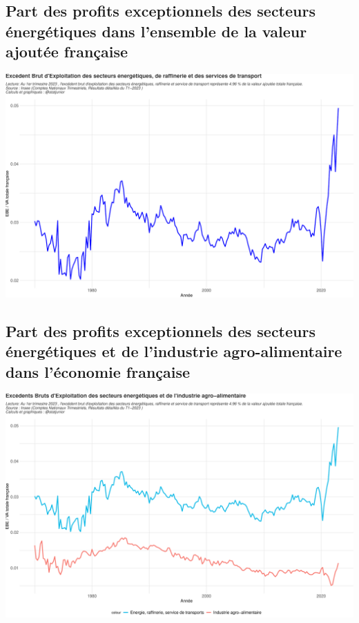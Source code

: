 \documentclass[
  paper=a4,
  ,captions=tableheading
]{scrartcl}
\begin{document}
\hypertarget{part-des-profits-exceptionnels-des-secteurs-uxe9nerguxe9tiques-dans-lensemble-de-la-valeur-ajoutuxe9e-franuxe7aise}{%
\subsection{Part des profits exceptionnels des secteurs énergétiques
dans l'ensemble de la valeur ajoutée
française}\label{part-des-profits-exceptionnels-des-secteurs-uxe9nerguxe9tiques-dans-lensemble-de-la-valeur-ajoutuxe9e-franuxe7aise}}

\includegraphics{rapport_pdf_compte_branche_files/figure-latex/unnamed-chunk-28-1.pdf}

\hypertarget{part-des-profits-exceptionnels-des-secteurs-uxe9nerguxe9tiques-et-de-lindustrie-agro-alimentaire-dans-luxe9conomie-franuxe7aise}{%
\subsection{Part des profits exceptionnels des secteurs énergétiques et
de l'industrie agro-alimentaire dans l'économie
française}\label{part-des-profits-exceptionnels-des-secteurs-uxe9nerguxe9tiques-et-de-lindustrie-agro-alimentaire-dans-luxe9conomie-franuxe7aise}}

\includegraphics{rapport_pdf_compte_branche_files/figure-latex/unnamed-chunk-29-1.pdf}
\end{document}
